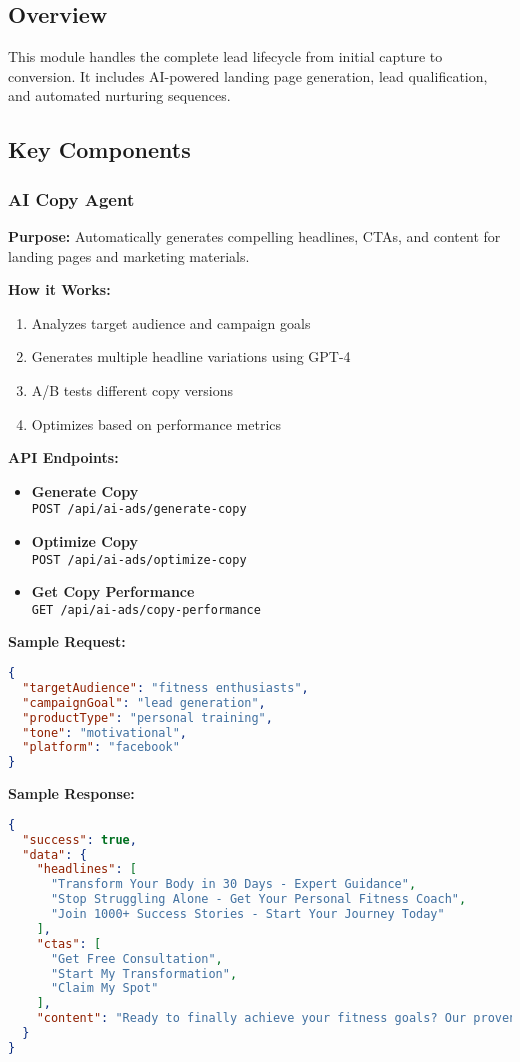 \documentclass[12pt,a4paper]{article}
\newcommand{\apiendpoint}[2]{\textbf{#1} \\ \texttt{#2}}
\newcommand{\samplecode}[1]{\begin{lstlisting}[language=JSON]#1\end{lstlisting}}
\begin{document}
\subsection{Overview}
This module handles the complete lead lifecycle from initial capture to conversion. It includes AI-powered landing page generation, lead qualification, and automated nurturing sequences.

\subsection{Key Components}

\subsubsection{AI Copy Agent}
\textbf{Purpose:} Automatically generates compelling headlines, CTAs, and content for landing pages and marketing materials.

\textbf{How it Works:}
\begin{enumerate}
    \item Analyzes target audience and campaign goals
    \item Generates multiple headline variations using GPT-4
    \item A/B tests different copy versions
    \item Optimizes based on performance metrics
\end{enumerate}

\textbf{API Endpoints:}
\begin{itemize}
    \item \apiendpoint{Generate Copy}{POST /api/ai-ads/generate-copy}
    \item \apiendpoint{Optimize Copy}{POST /api/ai-ads/optimize-copy}
    \item \apiendpoint{Get Copy Performance}{GET /api/ai-ads/copy-performance}
\end{itemize}

\textbf{Sample Request:}
\samplecode{
{
  "targetAudience": "fitness enthusiasts",
  "campaignGoal": "lead generation",
  "productType": "personal training",
  "tone": "motivational",
  "platform": "facebook"
}
}

\textbf{Sample Response:}
\samplecode{
{
  "success": true,
  "data": {
    "headlines": [
      "Transform Your Body in 30 Days - Expert Guidance",
      "Stop Struggling Alone - Get Your Personal Fitness Coach",
      "Join 1000+ Success Stories - Start Your Journey Today"
    ],
    "ctas": [
      "Get Free Consultation",
      "Start My Transformation",
      "Claim My Spot"
    ],
    "content": "Ready to finally achieve your fitness goals? Our proven system has helped over 1000 clients transform their lives..."
  }
}
}
\end{document}
